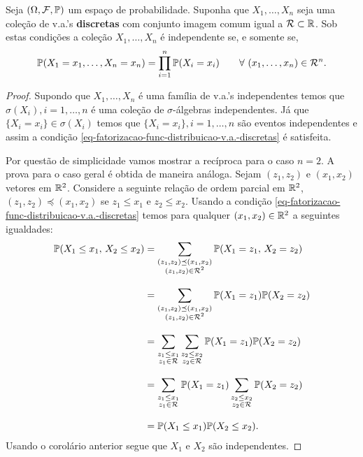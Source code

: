\begin{corolario}\label{cor-criterio-independencia-v.a.-discreta}
Seja $(\Omega,\F,\P)$ um espaço de probabilidade.
Suponha que $X_1,\ldots,X_n$ seja uma coleção de 
v.a.'s {\bf discretas} com conjunto imagem comum igual 
a $\mathcal{R}\subset \R$. Sob estas condições 
a coleção $X_1,\ldots,X_n$ é independente 
se, e somente se,  
	 	\begin{equation}\label{eq-fatorizacao-func-distribuicao-v.a.-discretas}
			\P(X_1= x_1,\ldots, X_n=x_n)
			=
			\prod_{i=1}^n \P(X_i = x_i)
			\qquad
			\forall\ (x_1,\ldots,x_n)\in\mathcal{R}^n.
		\end{equation}
\end{corolario}


\begin{proof}
Supondo que $X_1,\ldots,X_n$ é uma família de v.a.'s independentes
temos que $\sigma(X_i), i=1,\ldots,n$ é uma coleção
de $\sigma$-álgebras independentes.
Já que $\{X_i=x_i\}\in \sigma(X_i)$ temos que 
$\{X_i=x_i\}, i=1,\ldots, n$ são eventos independentes e assim a 
condição \ref{eq-fatorizacao-func-distribuicao-v.a.-discretas}
é satisfeita.

Por questão de simplicidade vamos 
mostrar a recíproca para o caso $n=2$. 
A prova para o caso geral é obtida
de maneira análoga. 
%
Sejam $(z_1,z_2)$ e $(x_1,x_2)$ vetores em $\R^2$. 
Considere a seguinte relação de ordem parcial em $\R^2$, 
$(z_1,z_2)\preceq (x_1,x_2)$ se $z_1\leq x_1$ e $z_2\leq x_2$.
Usando a condição \ref{eq-fatorizacao-func-distribuicao-v.a.-discretas}
temos para qualquer $(x_1,x_2)\in\R^2$ a seguintes igualdades:
\begin{align*}
\P(X_1\leq x_1,\, X_2\leq x_2)
&=
	\sum_{
		\substack {(z_1,z_2)\preceq (x_1,x_2) 
					\\ (z_1,z_2)\in\mathcal{R}^2 }  
	} 
	\P(X_1= z_1,\, X_2= z_2)
\\[0.3cm]
&=
	\sum_{
		\substack {(z_1,z_2)\preceq (x_1,x_2) 
					\\ (z_1,z_2)\in\mathcal{R}^2 }  
	} 
	\P(X_1= z_1) \P(X_2= z_2)
\\[0.3cm]
&=
	\sum_{\substack {z_1\leq x_1 \\ z_1\in\mathcal{R} } } 
	\sum_{\substack {z_2\leq x_2 \\ z_2\in\mathcal{R} } }
	\P(X_1= z_1) \P(X_2= z_2)
\\[0.3cm]
&=
	\sum_{\substack {z_1\leq x_1 \\ z_1\in\mathcal{R} } } 
	\P(X_1= z_1)
	\sum_{\substack {z_2\leq x_2 \\ z_2\in\mathcal{R} } }
	\P(X_2= z_2)
\\[0.3cm]
&=
	\P(X_1\leq x_1)\P(X_2\leq x_2).
\end{align*}
Usando o corolário anterior segue que $X_1$ e $X_2$
são independentes.
\end{proof}











